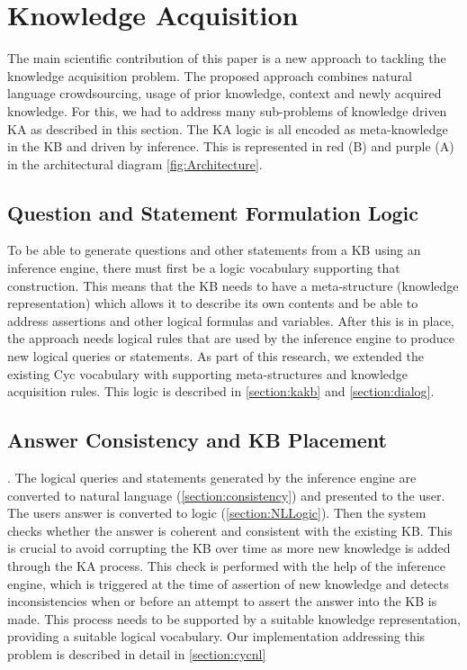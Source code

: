 \section{Knowledge Acquisition}
\label{section:bg:ka}
The main scientific contribution of this paper is a new approach to tackling 
the knowledge acquisition problem. The proposed approach combines natural 
language crowdsourcing, usage of prior knowledge, context and newly acquired 
knowledge. For this, we had to address many sub-problems of knowledge driven 
KA as described in this section. The KA logic is all encoded as meta-knowledge 
in the KB and driven by inference. This is represented in red (B) and purple 
(A) in the architectural diagram \autoref{fig:Architecture}.

\subsection{Question and Statement Formulation Logic} 
To be able to generate questions and other statements from a KB using an 
inference engine, there must first be a logic vocabulary supporting that 
construction. This means that the KB needs to have a meta-structure 
(knowledge representation) which allows it to describe its own contents and be
able to address assertions and other logical formulas and variables. After this
is in place, the approach needs logical rules that are used by the inference
engine to produce new logical queries or statements. As part of this research, 
we extended the existing Cyc vocabulary with supporting meta-structures and 
knowledge acquisition rules. This logic is described in \autoref{section:kakb}
and \autoref{section:dialog}.

\subsection{Answer Consistency and KB Placement}. 
The logical queries and statements generated by the inference engine are 
converted to natural language (\autoref{section:consistency}) and presented to 
the user. The users answer is converted to logic (\autoref{section:NLLogic}). 
Then the system checks whether the answer is coherent and consistent with the 
existing KB. This is crucial to avoid corrupting the KB over time as more new 
knowledge is added through the KA process. This check is performed with the 
help of the inference engine, which is triggered at the time of assertion of 
new knowledge and detects inconsistencies when or before an attempt to 
assert the answer into the KB is made. This process needs to be supported by a 
suitable knowledge representation, providing a suitable logical vocabulary. 
Our implementation addressing this problem is described in detail in 
\autoref{section:cycnl}

